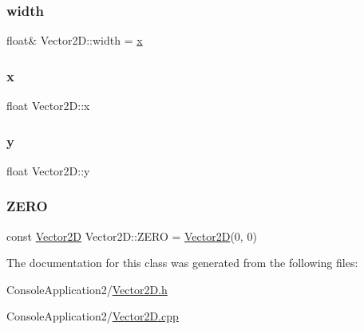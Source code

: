 \subsubsection{\texorpdfstring{width}{width}}
{\footnotesize\ttfamily float\& Vector2\+D\+::width = \hyperlink{class_vector2_d_aeb4253ba6555251d010ea4450619029e}{x}}

\hypertarget{class_vector2_d_aeb4253ba6555251d010ea4450619029e}{}\label{class_vector2_d_aeb4253ba6555251d010ea4450619029e} 
\subsubsection{\texorpdfstring{x}{x}}
{\footnotesize\ttfamily float Vector2\+D\+::x}

\hypertarget{class_vector2_d_a85215519d3f71d0e6be7d636346f3b7d}{}\label{class_vector2_d_a85215519d3f71d0e6be7d636346f3b7d} 
\subsubsection{\texorpdfstring{y}{y}}
{\footnotesize\ttfamily float Vector2\+D\+::y}

\hypertarget{class_vector2_d_ab9f4481b021711cbbd4ec78390aa1e6e}{}\label{class_vector2_d_ab9f4481b021711cbbd4ec78390aa1e6e} 
\subsubsection{\texorpdfstring{Z\+E\+RO}{ZERO}}
{\footnotesize\ttfamily const \hyperlink{class_vector2_d}{Vector2D} Vector2\+D\+::\+Z\+E\+RO = \hyperlink{class_vector2_d}{Vector2D}(0, 0)\hspace{0.3cm}{\ttfamily [static]}}



The documentation for this class was generated from the following files\+:\begin{DoxyCompactItemize}
\item 
Console\+Application2/\hyperlink{_vector2_d_8h}{Vector2\+D.\+h}\item 
Console\+Application2/\hyperlink{_vector2_d_8cpp}{Vector2\+D.\+cpp}\end{DoxyCompactItemize}
